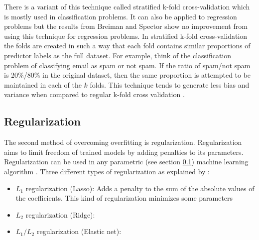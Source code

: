 	There is a variant of this technique called stratified k-fold cross-validation which is mostly used in classification problems.  It can also be applied to regression problems \cite{WEBSITE:10} but the results from Breiman and Spector \cite{ARTICLE:5} show no improvement from using this technique for regression problems. In stratified k-fold cross-validation the folds are created in such a way that each fold contains similar proportions of predictor labels as the full dataset. For example, think of the classification problem of classifying email as spam or not spam. If the ratio of spam/not spam is 20\%/80\% in the original dataset, then the same proportion is attempted to be maintained in each of the $k$ folds. This technique tends to generate less bias and variance when compared to regular k-fold cross validation \cite{IP:2}.

	\subsection{Regularization}
	The second method of overcoming overfitting is regularization. Regularization aims to limit freedom of trained models by adding penalties to its  parameters. Regularization can be used in any parametric (see section \ref{}) machine learning algorithm \cite{WEBSITE:11}. Three different types of regularization as explained by \cite{WEBSITE:11}:

\begin{itemize}
	\item{$L_1$ regularization (Lasso):} Adds a penalty to the sum of the absolute values of the coefficients. This kind of regularization minimizes some parameters  
	\item{$L_2$ regularization (Ridge):}
	\item{$L_1/L_2$ regularization (Elastic net):}
\end{itemize}


